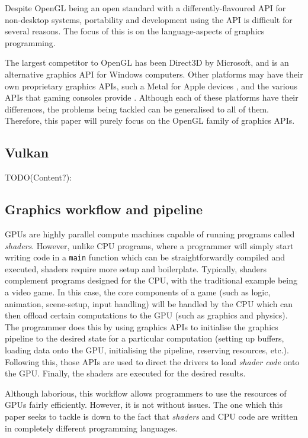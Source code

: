 \documentclass[a4paper,12pt,twoside,openright]{report}
\begin{document}
Despite OpenGL being an open standard with a differently-flavoured API for
non-desktop systems, portability and development using the API is difficult for
several reasons. The focus of this is on the language-aspects of graphics
programming.

The largest competitor to OpenGL has been Direct3D by Microsoft, and is an
alternative graphics API for Windows computers. Other platforms may have their
own proprietary graphics APIs, such a Metal for Apple devices , and the various
APIs that gaming consoles provide . Although each of these platforms have their
differences, the problems being tackled can be generalised to all of them.
Therefore, this paper will purely focus on the OpenGL family of graphics APIs.

\subsection{Vulkan}

TODO(Content?):

\subsection{Graphics workflow and pipeline}

GPUs are highly parallel compute machines capable of running programs called
\textit{shaders}. However, unlike CPU programs, where a programmer will simply
start writing code in a \texttt{main} function which can be straightforwardly
compiled and executed, shaders require more setup and boilerplate. Typically,
shaders complement programs designed for the CPU, with the traditional example
being a video game. In this case, the core components of a game (such as logic,
animation, scene-setup, input handling) will be handled by the CPU which can
then offload certain computations to the GPU (such as graphics and physics).
The programmer does this by using graphics APIs to initialise the graphics
pipeline to the desired state for a particular computation (setting up buffers,
loading data onto the GPU, initialising the pipeline, reserving resources,
etc.). Following this, those APIs are used to direct the drivers to load
\textit{shader code} onto the GPU. Finally, the shaders are executed for the
desired results.

Although laborious, this workflow allows programmers to use the resources of
GPUs fairly efficiently. However, it is not without issues. The one which this
paper seeks to tackle is down to the fact that \textit{shaders} and CPU code
are written in completely different programming languages.
\end{document}
